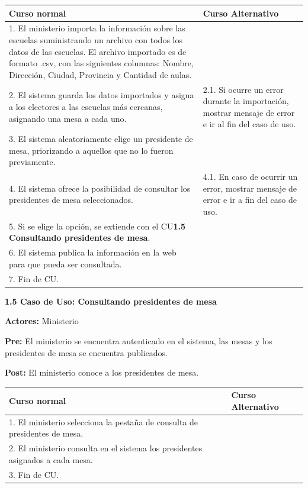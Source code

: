 \begin{table}[h!]
	
 \begin{tabular}{|p{7.5cm} | p{7.5cm}|} 
 \hline
 \textbf{Curso normal} & \textbf{Curso Alternativo} \\
 \hline

1. El ministerio importa la información sobre las escuelas suministrando un archivo con todos los datos de las escuelas. El archivo importado es de formato .csv, con las siguientes columnas: Nombre, Dirección, Ciudad, Provincia y Cantidad de aulas. & \\
\hline

2. El sistema guarda los datos importados y asigna a los electores a las escuelas más cercanas, asignando una mesa a cada uno. &
2.1. Si ocurre un error durante la importación, mostrar mensaje de error e ir al fin del caso de uso. \\
\hline
3. El sistema aleatoriamente elige un presidente de mesa, priorizando a aquellos que no lo fueron previamente. & \\
\hline

4. El sistema ofrece la posibilidad de consultar los presidentes de mesa seleccionados. &
4.1. En caso de ocurrir un error, mostrar mensaje de error e ir a fin del caso de uso. \\
\hline
5. Si se elige la opción, se extiende con el CU\textbf{1.5 Consultando presidentes de mesa}. & \\
\hline

6. El sistema publica la información en la web para que pueda ser consultada. & \\
\hline

7. Fin de CU. & \\
\hline

 \end{tabular}

\end{table}


\textbf{1.5 Caso de Uso: Consultando presidentes de mesa}

\textbf{Actores:} Ministerio 

\textbf{Pre:} El ministerio se encuentra autenticado en el sistema, las mesas y los presidentes de mesa se encuentra publicados.

\textbf{Post:} El ministerio conoce a los presidentes de mesa.
\begin{table}[h!]
	
 \begin{tabular}{|p{7.5cm} | p{7.5cm}|} 
 \hline
 \textbf{Curso normal} & \textbf{Curso Alternativo} \\
 \hline

1. El ministerio selecciona la pestaña de consulta de presidentes de mesa. & \\
\hline
2. El ministerio consulta en el sistema los presidentes asignados a cada mesa. & \\
\hline
3. Fin de CU. & \\
\hline
 \end{tabular}

\end{table}

